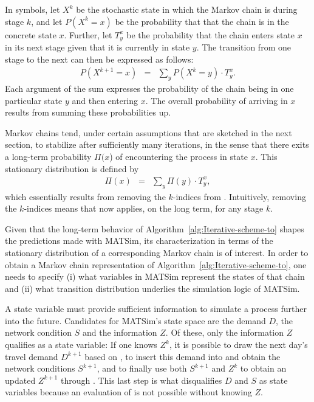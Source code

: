 In symbols, let $X^{k}$ be the stochastic state in which the Markov
chain is during stage $k$, and let $P(X^{k}=x)$ be the probability
that that the chain is in the concrete state $x$. Further, let $T_{y}^{x}$
be the probability that the chain enters state $x$ in its next stage
given that it is currently in state $y$. The transition from one
stage to the next can then be expressed as follows:
\begin{eqnarray}
P(X^{k+1}=x) & = & \sum_{y}P(X^{k}=y)\cdot T_{y}^{x}.\label{eq:one-mc-transition}
\end{eqnarray}
Each argument of the sum expresses the probability of the chain being
in one particular state $y$ and then entering $x$. The overall probability
of arriving in $x$ results from summing these probabilities up.

Markov chains tend, under certain assumptions that are sketched in
the next section, to stabilize after sufficiently many iterations,
in the sense that there exits a long-term probability $\Pi(x$) of
encountering the process in state $x$. This stationary distribution
is defined by
\begin{eqnarray}
\Pi(x) & = & \sum_{y}\Pi(y)\cdot T_{y}^{x},\label{eq:mc-stationary}
\end{eqnarray}
which essentially results from removing the $k$-indices from .
Intuitively, removing the $k$-indices means that 
now applies, on the long term, for any stage $k$.

Given that the long-term behavior of Algorithm~\ref{alg:Iterative-scheme-to}
shapes the predictions made with MATSim, its characterization in terms
of the stationary distribution of a corresponding Markov chain is
of interest. In order to obtain a Markov chain representation of Algorithm~\ref{alg:Iterative-scheme-to},
one needs to specify (i) what variables in MATSim represent the states
of that chain and (ii) what transition distribution underlies the
simulation logic of MATSim.

A state variable must provide sufficient information to simulate a
process further into the future. Candidates for MATSim's state space
are the demand $D$, the network condition $S$ and the information
$Z$. Of these, only the information $Z$ qualifies as a state variable:
If one knows $Z^{k}$, it is possible to draw the next day's travel
demand $D^{k+1}$ based on , to insert this
demand into  and obtain the network
conditions $S^{k+1}$, and to finally use both $S^{k+1}$ and $Z^{k}$
to obtain an updated $Z^{k+1}$ through .
This last step is what disqualifies $D$ and $S$ as state variables
because an evaluation of  is not possible
without knowing $Z$.

